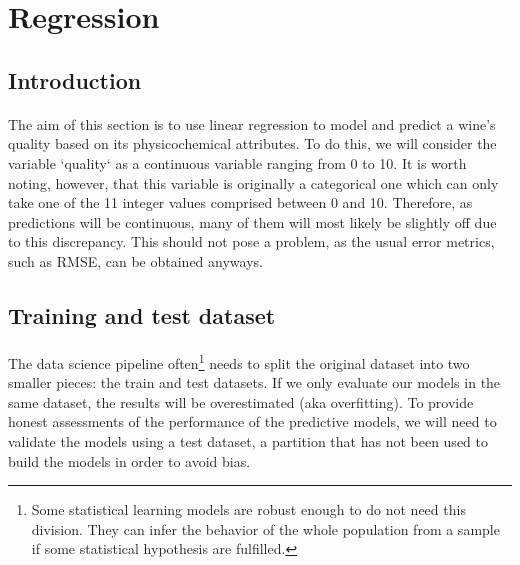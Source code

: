 \documentclass[10pt]{article}
\begin{document}




\tableofcontents

\newpage
{}



\section{Regression}

\subsection{Introduction}
\paragraph*{}
The aim of this section is to use linear regression to model and predict a wine's quality based on its physicochemical attributes. To do this, we will consider the variable `quality` as a continuous variable ranging from 0 to 10. It is worth noting, however, that this variable is originally a categorical one which can only take one of the 11 integer values comprised between 0 and 10. Therefore, as predictions will be continuous, many of them will most likely be slightly off due to this discrepancy. This should not pose a problem,  as the usual error metrics, such as RMSE, can be obtained anyways.

\subsection{Training and test dataset}

\paragraph*{}
The data science pipeline often\footnote{Some statistical learning models are robust enough to do not need this division. They can infer the behavior of the whole population from a sample if some statistical hypothesis are fulfilled.} needs to split the original dataset into two smaller pieces: the train and test datasets. If we only evaluate our models in the same dataset, the results will be overestimated (aka overfitting). To provide honest assessments of the performance of the predictive models, we will need to validate the models using a test dataset, a partition that has not been used to build the models in order to avoid bias. 
\end{document}
